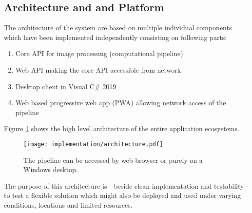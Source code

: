 \subsection{Architecture and and Platform}\label{sec:architecture}

The architecture of the system are based on multiple individual components which have been implemented
independently consisting on following parts:

\begin{enumerate}
    \item Core API for image processing (computational pipeline) \cite{greenhouseplusplus}
    \item Web API making the core API accessible from network \cite{greenhouseplusplus}
    \item Desktop client in Visual C\# 2019 \cite{greenhouseplusplus}
    \item Web based progressive web app (PWA) allowing network access of the pipeline \cite{greenhouseplusplus:app}
\end{enumerate}

Figure \ref{fig:arch} shows the high level architecture of the entire application ecosystems.

\begin{figure}[H]
    \centering
    \texttt{[image: implementation/architecture.pdf]}
    \caption{The pipeline can be accessed by web browser or purely on a Windows desktop.}
    \label{fig:arch}
\end{figure}

The purpose of this architecture is - beside clean implementation and testability - to test a flexible
solution which might also be deployed and used under varying conditions, locations and limited resources.
